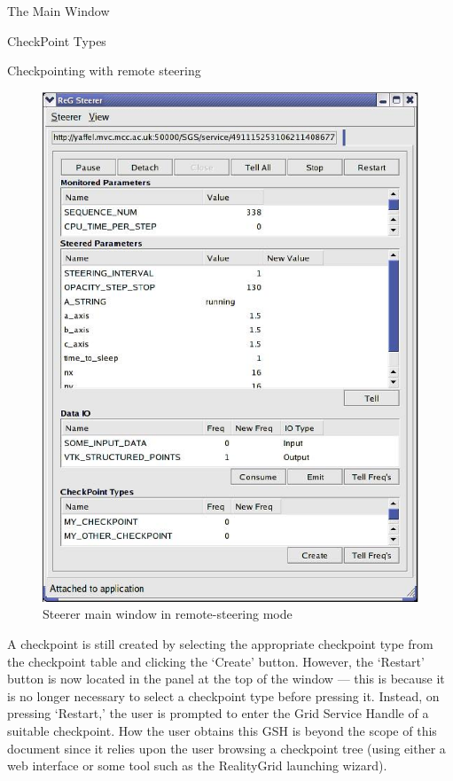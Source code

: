 \documentclass[a4paper,twoside]{article}
\begin{document}
\begin{section}{The Main Window}
\begin{subsection}{CheckPoint Types}
\begin{subsubsection}{Checkpointing with remote steering}
\begin{figure}
\centerline{\includegraphics{main_window_grid.eps}}
\caption{Steerer main window in remote-steering mode}
\label{fig:main_window_grid}
\end{figure}

A checkpoint is still created by selecting the appropriate checkpoint
type from the checkpoint table and clicking the `Create' button.
However, the `Restart' button is now located in the panel at the top
of the window --- this is because it is no longer necessary to select a
checkpoint type before pressing it.  Instead, on pressing `Restart,'
the user is prompted to enter the Grid Service Handle of a suitable
checkpoint.  How the user obtains this GSH is beyond the scope of this
document since it relies upon the user browsing a checkpoint tree
(using either a web interface or some tool such as the RealityGrid
launching wizard).

\end{subsubsection} %

\end{subsection} %
\end{section} %
\end{document}
